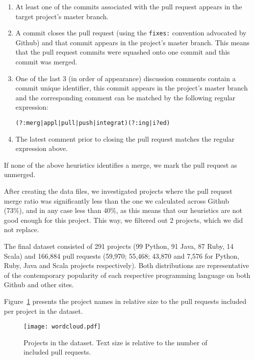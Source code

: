 \documentclass{sig-alternate}
\begin{document}
\begin{enumerate}

  \item At least one of the commits associated with the pull request appears in
    the target project's master branch. 

  \item A commit closes the pull request (using the \texttt{fixes:} convention
    advocated by Github) and that commit appears in the project's master branch.
    This means that the pull request commits were squashed onto one commit and
    this commit was merged.

  \item One of the last 3 (in order of appearance) discussion comments contain a
    commit unique identifier, this commit appears in the project's master branch
    and the corresponding comment can be matched by the following regular
    expression:

    \begin{small}
    \texttt{(?:merg|appl|pull|push|integrat)(?:ing|i?ed)}
    \end{small}
  \item The latest comment prior to closing the pull request matches the 
    regular expression above.

\end{enumerate}

If none of the above heuristics identifies a merge, we mark the pull request
as unmerged.

After creating the data files, we investigated projects where the pull request
merge ratio was significantly less than the one we calculated across Github
(73\%), and in any case less than 40\%, as this means that our heuristics are not
good enough for this project. This way, we filtered out 2 projects, which we did not
replace.

The final dataset consisted of 291 projects (99 Python, 91 Java, 87 Ruby, 14
Scala) and 166,884 pull requests (59,970; 55,468; 43,870 and 7,576 for Python,
Ruby, Java and Scala projects respectively). Both distributions are
representative of the contemporary popularity of each respective programming
language on both Github and other sites.

Figure~\ref{fig:wordcloud} presents the project names in relative size to the
pull requests included per project in the dataset.

\begin{figure}
  \begin{center}
    \texttt{[image: wordcloud.pdf]}
  \end{center}
  \caption{Projects in the \pullreq dataset. Text size is relative to the number of
  included pull requests.}
  \label{fig:wordcloud}
\end{figure}
\end{document}
